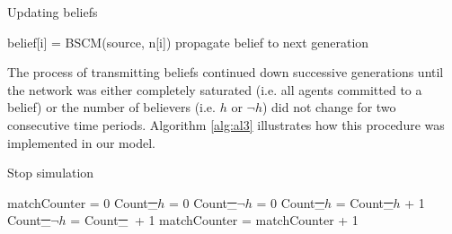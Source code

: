 \documentclass[fleqn,10pt]{wlscirep}
\providecommand{\DIFadd}[1]{{\protect\color{blue}\uwave{#1}}} %
\providecommand{\DIFdel}[1]{{\protect\color{red}\sout{#1}}}                      %
\providecommand{\DIFaddbegin}{} %
\providecommand{\DIFaddend}{} %
\providecommand{\DIFdelbegin}{} %
\providecommand{\DIFdelend}{} %
\begin{document}
\begin{algorithm}[H]
\caption{Updating beliefs}\label{update}
\begin{algorithmic}[1]
    \DIFdelbegin %

\DIFdelend {}
     \label{alg:al2}
             \State belief[i] = BSCM(source, n[i])
              \State propagate belief to next generation
              \EndIf
             \EndIf
        \EndFor
    \EndIf
  \EndProcedure
\end{algorithmic}
\end{algorithm}

The process of transmitting beliefs continued down successive generations until the network was either completely saturated (i.e. all agents committed to a belief) or the number of believers (i.e. \(h\) or \(\neg h\)) did not change for two consecutive time periods. Algorithm \ref{alg:al3} illustrates how this procedure was implemented in our model.

\begin{algorithm}[H]
\caption{Stop simulation}\label{proceed}
\begin{algorithmic}[1]
    \State matchCounter = 0 
    \State Count\DIFdelbegin \DIFdel{_{\(h\)} }\DIFdelend \DIFaddbegin \DIFadd{\(_{h}\) }\DIFaddend = 0
     \label{alg:al3}
    \State Count\DIFdelbegin \DIFdel{_{\(\neg h\)} }\DIFdelend \DIFaddbegin \DIFadd{\(_{\neg h}\) }\DIFaddend = 0
            \State Count\DIFdelbegin \DIFdel{_{\(h\)} }\DIFdelend \DIFaddbegin \DIFadd{\(_{h}\) }\DIFaddend = Count\DIFdelbegin \DIFdel{_{\(h\)} }\DIFdelend \DIFaddbegin \DIFadd{\(_{h}\) }\DIFaddend + 1
        \EndIf
            \State Count\DIFdelbegin \DIFdel{_{\(\neg h\)} }\DIFdelend \DIFaddbegin \DIFadd{\(_{\neg h}\) }\DIFaddend = Count\DIFdelbegin \DIFdel{_{\(\ \)} }\DIFdelend \DIFaddbegin \DIFadd{\(_{\neg h }\) }\DIFaddend + 1
        \EndIf
    \EndFor
    \DIFdelbegin %
\DIFdelend \DIFaddbegin {}
        \DIFaddend \State matchCounter = matchCounter + 1
    \EndIf
  \EndProcedure
\end{algorithmic}
\end{algorithm}
\end{document}
